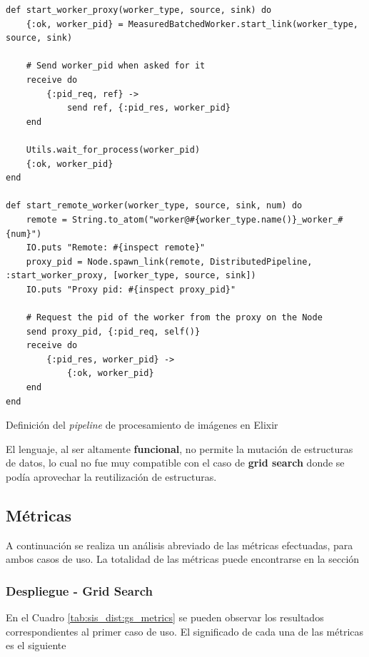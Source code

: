 \documentclass[11pt]{article}
\let\Oldsubsection\subsection
\renewcommand{\subsection}{\FloatBarrier\Oldsubsection}
\let\Oldsubsubsection\subsubsection
\renewcommand{\subsubsection}{\FloatBarrier\Oldsubsubsection}
\begin{document}
\begin{listing}[ht]
\begin{verbatim}
def start_worker_proxy(worker_type, source, sink) do
    {:ok, worker_pid} = MeasuredBatchedWorker.start_link(worker_type, source, sink)
    
    # Send worker_pid when asked for it
    receive do
        {:pid_req, ref} ->
            send ref, {:pid_res, worker_pid}
    end
    
    Utils.wait_for_process(worker_pid)
    {:ok, worker_pid}
end

def start_remote_worker(worker_type, source, sink, num) do
    remote = String.to_atom("worker@#{worker_type.name()}_worker_#{num}")
    IO.puts "Remote: #{inspect remote}"
    proxy_pid = Node.spawn_link(remote, DistributedPipeline, :start_worker_proxy, [worker_type, source, sink])
    IO.puts "Proxy pid: #{inspect proxy_pid}"
    
    # Request the pid of the worker from the proxy on the Node
    send proxy_pid, {:pid_req, self()}
    receive do
        {:pid_res, worker_pid} ->
            {:ok, worker_pid}
    end
end
\end{verbatim}
\caption{Definición del \textit{pipeline} de procesamiento de imágenes en Elixir}
\label{code:elx:start_worker}
\end{listing}

El lenguaje, al ser altamente \textbf{funcional}, no permite la mutación de estructuras de datos, lo cual no fue muy compatible con el caso de \textbf{grid search} donde se podía aprovechar la reutilización de estructuras.

\subsection{Métricas}

A continuación se realiza un análisis abreviado de las métricas efectuadas, para ambos casos de uso.
La totalidad de las métricas puede encontrarse en la sección 

\subsubsection{Despliegue - Grid Search}

En el Cuadro \ref{tab:sis_dist:gs_metrics} se pueden observar los resultados correspondientes al primer caso de uso. El significado de cada una de las métricas es el siguiente
\end{document}
